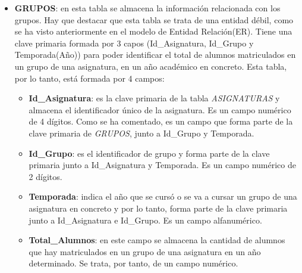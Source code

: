 \begin{itemize}
\item
\textbf{GRUPOS}: en esta tabla se almacena la información relacionada con los grupos. Hay que destacar que esta tabla se trata de una entidad débil, como se ha visto anteriormente en el modelo de Entidad Relación(ER). Tiene una clave primaria formada por 3 capos (Id\_Asignatura, Id\_Grupo y Temporada(Año)) para poder identificar el total de alumnos matriculados en un grupo de una asignatura, en un año académico en concreto. Esta tabla, por lo tanto, está formada por 4 campos:
\begin{itemize}
\item
\textbf{Id\_Asignatura}: es la clave primaria de la tabla \emph{ASIGNATURAS} y almacena el identificador único de la asignatura. Es un campo numérico de 4 dígitos. Como se ha comentado, es un campo que forma parte de la clave primaria de \emph{GRUPOS}, junto a  Id\_Grupo y Temporada.
\item
\textbf{Id\_Grupo}: es el identificador de grupo y forma parte de la clave primaria junto a  Id\_Asignatura y Temporada. Es un campo numérico de 2 dígitos.
\item
\textbf{Temporada}: indica el año que se cursó o se va a cursar un grupo de una asignatura en concreto y por lo tanto, forma parte de la clave primaria junto a  Id\_Asignatura e Id\_Grupo. Es un campo alfanumérico.
\item
\textbf{Total\_Alumnos}: en este campo se almacena la cantidad de alumnos que hay matriculados en un grupo de una asignatura en un año determinado. Se trata, por tanto, de un campo numérico.
\end{itemize}






\end{itemize}
